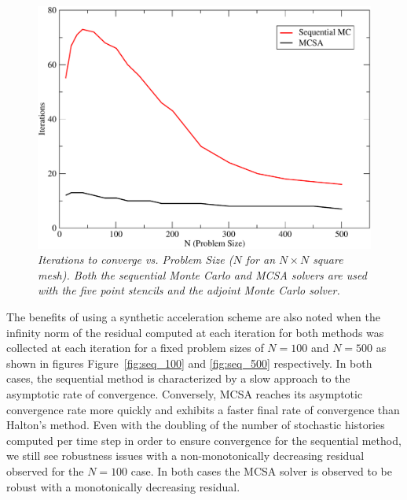 \documentclass[preprint,12pt]{elsarticle}
\begin{document}
\begin{figure}[ht!]
  \centering
  \includegraphics[width=5in,clip]{seq_iterations.pdf}
  \caption{\sl Iterations to converge vs. Problem Size ($N$ for an $N
    \times N$ square mesh). Both the sequential Monte Carlo and MCSA
    solvers are used with the five point stencils and the adjoint
    Monte Carlo solver.}
  \label{fig:seq_iterations}
\end{figure}

The benefits of using a synthetic acceleration scheme are also noted when the
infinity norm of the residual computed at each iteration for both methods was
collected at each iteration for a fixed problem sizes of $N=100$ and $N=500$
as shown in figures Figure~\ref{fig:seq_100} and \ref{fig:seq_500}
respectively. In both cases, the sequential method is characterized by a slow
approach to the asymptotic rate of convergence.  Conversely, MCSA reaches its
asymptotic convergence rate more quickly and exhibits a faster final rate of
convergence than Halton's method. Even with the doubling of the number of
stochastic histories computed per time step in order to ensure convergence for
the sequential method, we still see robustness issues with a non-monotonically
decreasing residual observed for the $N=100$ case. In both cases the MCSA
solver is observed to be robust with a monotonically decreasing residual.
\end{document}
